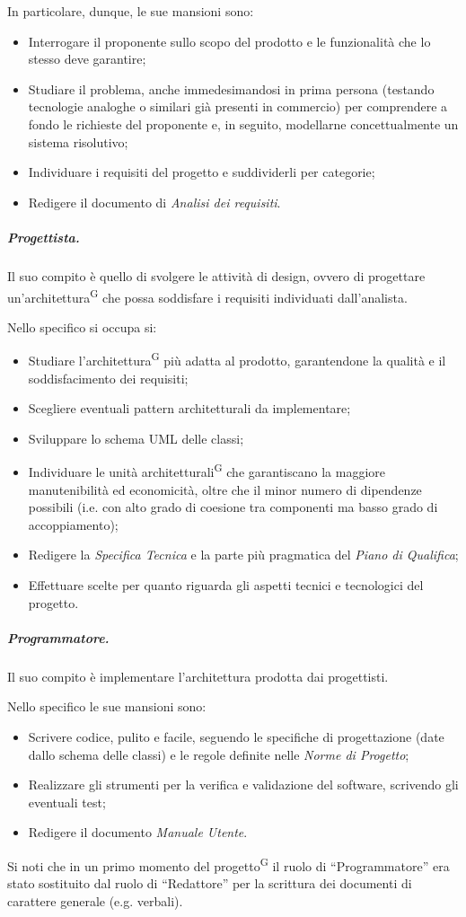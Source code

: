 In particolare, dunque, le sue mansioni sono:
\begin{itemize}
    \item Interrogare il proponente sullo scopo del prodotto e le funzionalità che lo stesso deve garantire;
    \item Studiare il problema, anche immedesimandosi in prima persona (testando tecnologie analoghe o similari già presenti in commercio) per comprendere a fondo le richieste del proponente e, in seguito, modellarne concettualmente un sistema risolutivo;
    \item Individuare i requisiti del progetto e suddividerli per categorie;
    \item Redigere il documento di \textit{Analisi dei requisiti}.
\end{itemize}

\subparagraph{Progettista.}
Il suo compito è quello di svolgere le attività di design, ovvero di progettare un'architettura\textsuperscript{G} che possa soddisfare i requisiti individuati dall'analista.

Nello specifico si occupa si:
\begin{itemize}
    \item Studiare l'architettura\textsuperscript{G} più adatta al prodotto, garantendone la qualità e il soddisfacimento dei requisiti;
    \item Scegliere eventuali pattern architetturali da implementare;
    \item Sviluppare lo schema UML delle classi;
    \item Individuare le unità architetturali\textsuperscript{G} che garantiscano la maggiore manutenibilità ed economicità, oltre che il minor numero di dipendenze possibili (i.e. con alto grado di coesione tra componenti ma basso grado di accoppiamento);
    \item Redigere la \textit{Specifica Tecnica} e la parte più pragmatica del \textit{Piano di Qualifica};
    \item Effettuare scelte per quanto riguarda gli aspetti tecnici e tecnologici del progetto.
\end{itemize}

\subparagraph{Programmatore.}
Il suo compito è implementare l'architettura prodotta dai progettisti.

Nello specifico le sue mansioni sono:
\begin{itemize}
    \item Scrivere codice, pulito e facile, seguendo le specifiche di progettazione (date dallo schema delle classi) e le regole definite nelle \textit{Norme di Progetto};
    \item Realizzare gli strumenti per la verifica e validazione del software, scrivendo gli eventuali test;
    \item Redigere il documento \textit{Manuale Utente}.
\end{itemize}
Si noti che in un primo momento del progetto\textsuperscript{G} il ruolo di ``Programmatore'' era stato sostituito dal ruolo di ``Redattore'' per la scrittura dei documenti di carattere generale (e.g. verbali).

